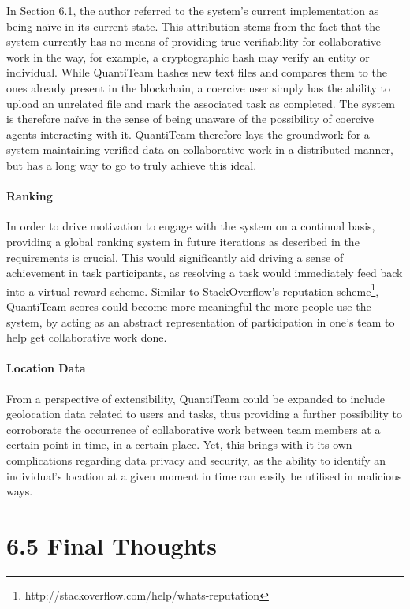 \documentclass[12pt]{report}
\let\oldparagraph\paragraph
\renewcommand{\paragraph}[1]{\oldparagraph{#1}\mbox{}}
\begin{document}
In Section 6.1, the author referred to the system's current
implementation as being naïve in its current state. This attribution
stems from the fact that the system currently has no means of providing
true verifiability for collaborative work in the way, for example, a
cryptographic hash may verify an entity or individual. While QuantiTeam
hashes new text files and compares them to the ones already present in
the blockchain, a coercive user simply has the ability to upload an
unrelated file and mark the associated task as completed. The system is
therefore naïve in the sense of being unaware of the possibility of
coercive agents interacting with it. QuantiTeam therefore lays the
groundwork for a system maintaining verified data on collaborative work
in a distributed manner, but has a long way to go to truly achieve this
ideal.

\paragraph{Ranking}\label{ranking}

In order to drive motivation to engage with the system on a continual
basis, providing a global ranking system in future iterations as
described in the requirements is crucial. This would significantly aid
driving a sense of achievement in task participants, as resolving a task
would immediately feed back into a virtual reward scheme. Similar to
StackOverflow's reputation
scheme\footnote{http://stackoverflow.com/help/whats-reputation}, QuantiTeam scores could become more meaningful the more
people use the system, by acting as an abstract representation of
participation in one's team to help get collaborative work done.

\paragraph{Location Data}\label{location-data}

From a perspective of extensibility, QuantiTeam could be expanded to
include geolocation data related to users and tasks, thus providing a
further possibility to corroborate the occurrence of collaborative work
between team members at a certain point in time, in a certain place.
Yet, this brings with it its own complications regarding data privacy
and security, as the ability to identify an individual's location at a
given moment in time can easily be utilised in malicious ways.

\section{6.5 Final Thoughts}\label{final-thoughts}
\end{document}
